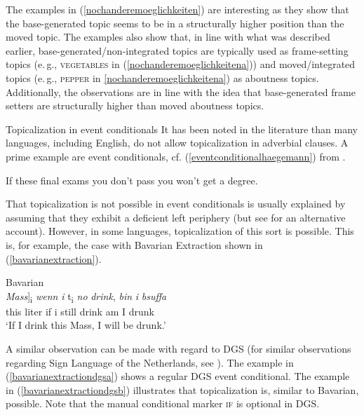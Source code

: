 \noindent The examples in (\ref{nochanderemoeglichkeiten}) are interesting as they show that the base-generated topic seems to be in a structurally higher position than the moved topic. The examples also show that, in line with what was described earlier, base-generated/non-integrated topics are typically used as frame-setting topics (e.\,g., \textsc{vegetables} in (\ref{nochanderemoeglichkeitena})) and moved/integrated topics (e.\,g., \textsc{pepper} in \ref{nochanderemoeglichkeitena}) as aboutness topics. Additionally, the observations are in line with the idea that base-generated frame setters are structurally higher than moved aboutness topics. 



\begin{digression}{Topicalization in event conditionals}{}
\noindent It has been noted in the literature than many languages, including English, do not allow topicalization in adverbial clauses. A prime example are event conditionals, cf. (\ref{eventconditionalhaegemann}) from \citet[332]{haegeman2003conditional}.

\begin{exe}
\ex *If these final exams you don't pass you won't get a degree. \label{eventconditionalhaegemann}
\end{exe}

\noindent That topicalization is not possible in event conditionals is usually explained by assuming that they exhibit a deficient left periphery \citep{haegeman2003conditional, haegeman2004topicalization} (but see \citealt{haegeman2013syntax} for an alternative account). However, in some languages, topicalization of this sort is possible. This is, for example, the case with Bavarian Extraction shown in (\ref{bavarianextraction}).

\begin{exe}
\ex Bavarian \citep[232]{grewendorf2015bavarian} \\ \gll {[\textit{De}} {\textit{Mass}]\textsubscript{i}} {\textit{wenn}} {\textit{i}} {t\textsubscript{i}} {\textit{no}} {\textit{drink},} {\textit{bin}} {\textit{i}} {\textit{bsuffa}}   \\
{this} {liter} {if} {i} {} {still} {drink} {am} {I} {drunk} \\
\trans `If I drink this Mass, I will be drunk.'   \label{bavarianextraction}
\end{exe}

\noindent A similar observation can be made with regard to DGS (for similar observations regarding Sign Language of the Netherlands, see \citealt{pfau2008topics}). The example in (\ref{bavarianextractiondgsa}) shows a regular DGS event conditional. The example in (\ref{bavarianextractiondgsb}) illustrates that topicalization is, similar to Bavarian, possible. Note that the manual conditional marker \textsc{if} is optional in DGS. 


\end{digression}
